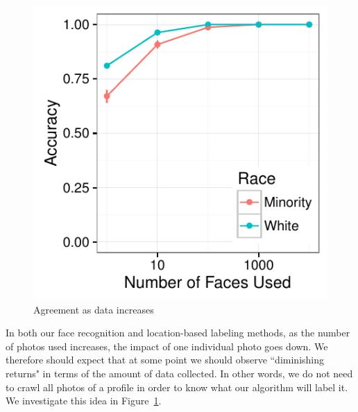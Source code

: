 \begin{figure}
  \centering
  \includegraphics[width=\linewidth]{fig/census/faces_v_accuracy_race_large-eps-converted-to.pdf}
  \caption{Agreement as data increases}
  \label{fig:faces_v_accuracy_large}
\end{figure}

In both our face recognition and location-based labeling methods, as the number of photos used increases, the impact of one individual photo goes down.
We therefore should expect that at some point we should observe ``diminishing returns" in terms of the amount of data collected.
In other words, we do not need to crawl all photos of a profile in order to know what our algorithm will label it.
We investigate this idea in Figure~\ref{fig:faces_v_accuracy_large}.

